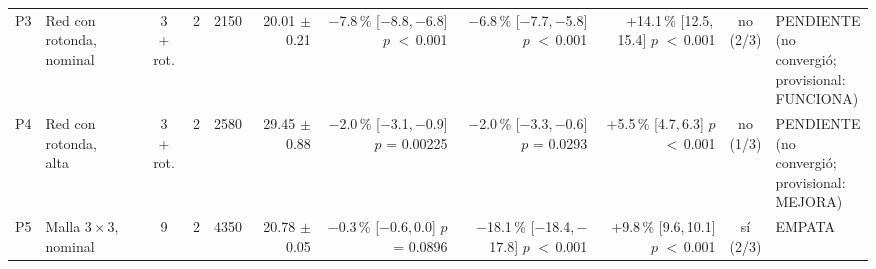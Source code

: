 \begin{table}[H]
\begin{tabular}{llcrrrrrrcl}
P3 & \makecell[l]{Red con\\{}rotonda,\\{}nominal} & \makecell[c]{3\\{}+ rot.} & 2 & 2150 & \makecell[r]{20.01\\{}$\pm$ 0.21} & \makecell[r]{$-$7.8\,\%\\{}[$-$8.8,\,$-$6.8]\\$p$ $<$\,0.001} & \makecell[r]{$-$6.8\,\%\\{}[$-$7.7,\,$-$5.8]\\$p$ $<$\,0.001} & \makecell[r]{+14.1\,\%\\{}[12.5,\,15.4]\\$p$ $<$\,0.001} & \makecell[c]{no\\{}(2/3)} & \makecell[l]{PENDIENTE\\{}(no convergió;\\{}provisional:\\{}FUNCIONA)} \\
P4 & \makecell[l]{Red con\\{}rotonda,\\{}alta} & \makecell[c]{3\\{}+ rot.} & 2 & 2580 & \makecell[r]{29.45\\{}$\pm$ 0.88} & \makecell[r]{$-$2.0\,\%\\{}[$-$3.1,\,$-$0.9]\\$p$ = 0.00225} & \makecell[r]{$-$2.0\,\%\\{}[$-$3.3,\,$-$0.6]\\$p$ = 0.0293} & \makecell[r]{+5.5\,\%\\{}[4.7,\,6.3]\\$p$ $<$\,0.001} & \makecell[c]{no\\{}(1/3)} & \makecell[l]{PENDIENTE\\{}(no convergió;\\{}provisional:\\{}MEJORA)} \\
P5 & \makecell[l]{Malla $3 \times 3$,\\{}nominal} & 9 & 2 & 4350 & \makecell[r]{20.78\\{}$\pm$ 0.05} & \makecell[r]{$-$0.3\,\%\\{}[$-$0.6,\,0.0]\\$p$ = 0.0896} & \makecell[r]{$-$18.1\,\%\\{}[$-$18.4,\,$-$17.8]\\$p$ $<$\,0.001} & \makecell[r]{+9.8\,\%\\{}[9.6,\,10.1]\\$p$ $<$\,0.001} & \makecell[c]{sí\\{}(2/3)} & EMPATA \\

\end{tabular}
\end{table}
